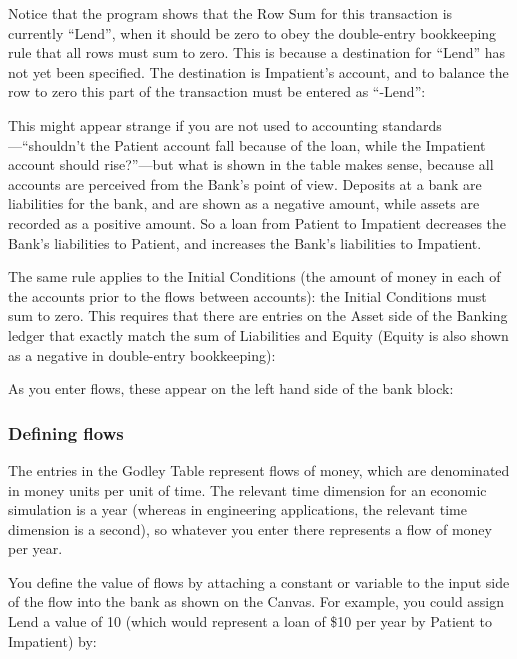 
Notice that the program shows that the Row Sum for this transaction is
currently ``Lend'', when it should be zero to obey the double-entry
bookkeeping rule that all rows must sum to zero. This is because a
destination for ``Lend'' has not yet been specified. The destination
is Impatient's account, and to balance the row to zero this part of
the transaction must be entered as ``-Lend'': 


This might appear strange if you are not used to accounting
standards---``shouldn't the Patient account fall because of the loan,
while the Impatient account should rise?''---but what is shown in the
table makes sense, because all accounts are perceived from the Bank's
point of view. Deposits at a bank are liabilities for the bank, and
are shown as a negative amount, while assets are recorded as a
positive amount. So a loan from Patient to Impatient decreases the
Bank's liabilities to Patient, and increases the Bank's liabilities to
Impatient. 

The same rule applies to the Initial Conditions (the amount of money
in each of the accounts prior to the flows between accounts): the
Initial Conditions must sum to zero. This requires that there are
entries on the Asset side of the Banking ledger that exactly match the
sum of Liabilities and Equity (Equity is also shown as a negative in
double-entry bookkeeping): 


As you enter flows, these appear on the left hand side of the bank block:


\subsubsection{Defining flows}

The entries in the Godley Table represent flows of money, which are
denominated in money units per unit of time. The relevant time
dimension for an economic simulation is a year (whereas in engineering
applications, the relevant time dimension is a second), so whatever
you enter there represents a flow of money per year.


You define the value of flows by attaching a constant or variable to
the input side of the flow into the bank as shown on the Canvas. For
example, you could assign Lend a value of 10 (which would represent a
loan of \$10 per year by Patient to Impatient) by:



